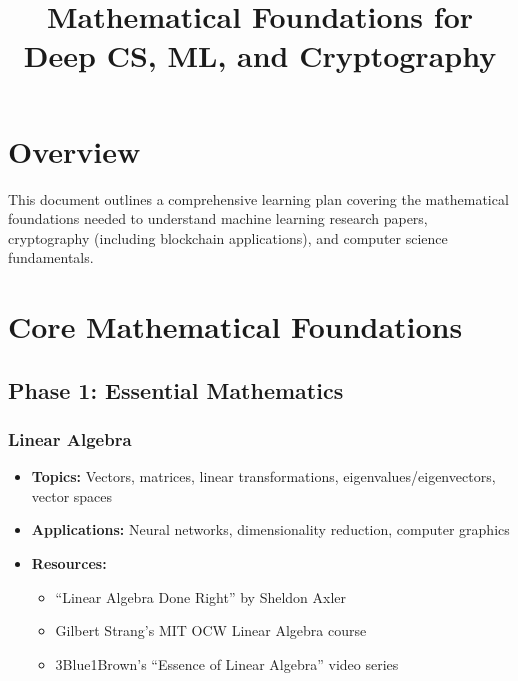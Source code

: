 \documentclass{article}
\title{Mathematical Foundations for Deep CS, ML, and Cryptography}
\begin{document}
\maketitle

\section{Overview}

This document outlines a comprehensive learning plan covering the mathematical foundations needed to understand machine learning research papers, cryptography (including blockchain applications), and computer science fundamentals.

\section{Core Mathematical Foundations}

\subsection{Phase 1: Essential Mathematics}

\subsubsection{Linear Algebra}
\begin{itemize}[leftmargin=*]
    \item \textbf{Topics:} Vectors, matrices, linear transformations, eigenvalues/eigenvectors, vector spaces
    \item \textbf{Applications:} Neural networks, dimensionality reduction, computer graphics
    \item \textbf{Resources:}
    \begin{itemize}
        \item ``Linear Algebra Done Right'' by Sheldon Axler
        \item Gilbert Strang's MIT OCW Linear Algebra course
        \item 3Blue1Brown's ``Essence of Linear Algebra'' video series
    \end{itemize}
\end{itemize}
\end{document}

